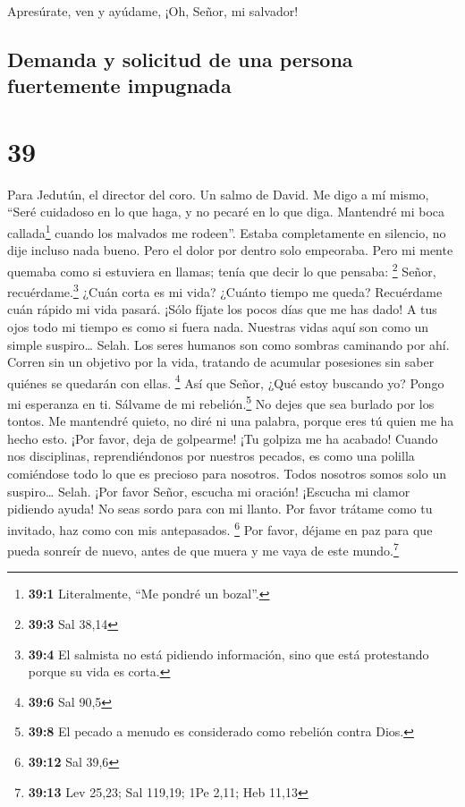  Apresúrate, ven y ayúdame, ¡Oh, Señor, mi salvador!

\hypertarget{demanda-y-solicitud-de-una-persona-fuertemente-impugnada}{%
\subsection{Demanda y solicitud de una persona fuertemente
impugnada}\label{demanda-y-solicitud-de-una-persona-fuertemente-impugnada}}

\hypertarget{section-38}{%
\section{39}\label{section-38}}

Para Jedutún, el director del coro. Un salmo de David.  Me
digo a mí mismo, ``Seré cuidadoso en lo que haga, y no pecaré en lo que
diga. Mantendré mi boca callada\footnote{\textbf{39:1} Literalmente,
  ``Me pondré un bozal''.} cuando los malvados me rodeen''.
 Estaba completamente en silencio, no dije incluso nada
bueno. Pero el dolor por dentro solo empeoraba.  Pero mi
mente quemaba como si estuviera en llamas; tenía que decir lo que
pensaba: \footnote{\textbf{39:3} Sal 38,14}  Señor,
recuérdame.\footnote{\textbf{39:4} El salmista no está pidiendo
  información, sino que está protestando porque su vida es corta.} ¿Cuán
corta es mi vida? ¿Cuánto tiempo me queda? Recuérdame cuán rápido mi
vida pasará.  ¡Sólo fíjate los pocos días que me has dado!
A tus ojos todo mi tiempo es como si fuera nada. Nuestras vidas aquí son
como un simple suspiro\ldots{} Selah.  Los seres humanos
son como sombras caminando por ahí. Corren sin un objetivo por la vida,
tratando de acumular posesiones sin saber quiénes se quedarán con ellas.
\footnote{\textbf{39:6} Sal 90,5}  Así que Señor, ¿Qué
estoy buscando yo? Pongo mi esperanza en ti.  Sálvame de
mi rebelión.\footnote{\textbf{39:8} El pecado a menudo es considerado
  como rebelión contra Dios.} No dejes que sea burlado por los tontos.
 Me mantendré quieto, no diré ni una palabra, porque eres
tú quien me ha hecho esto.  ¡Por favor, deja de
golpearme! ¡Tu golpiza me ha acabado!  Cuando nos
disciplinas, reprendiéndonos por nuestros pecados, es como una polilla
comiéndose todo lo que es precioso para nosotros. Todos nosotros somos
solo un suspiro\ldots{} Selah.  ¡Por favor Señor, escucha
mi oración! ¡Escucha mi clamor pidiendo ayuda! No seas sordo para con mi
llanto. Por favor trátame como tu invitado, haz como con mis
antepasados. \footnote{\textbf{39:12} Sal 39,6}  Por
favor, déjame en paz para que pueda sonreír de nuevo, antes de que muera
y me vaya de este mundo.\footnote{\textbf{39:13} Lev 25,23; Sal 119,19;
  1Pe 2,11; Heb 11,13}

